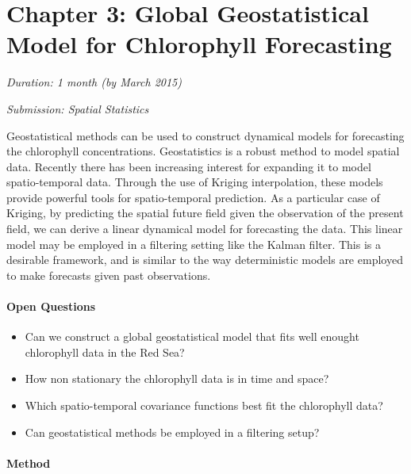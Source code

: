 \section{Chapter 3: Global Geostatistical Model for Chlorophyll Forecasting}

\noindent \emph{Duration: 1 month (by March 2015)}

\noindent \emph{Submission: Spatial Statistics}

\vspace{5mm}

Geostatistical methods can be used to construct dynamical models for
forecasting the chlorophyll concentrations. Geostatistics is a robust method to
model spatial data.  Recently there has been increasing interest for expanding
it to model spatio-temporal data. Through the use of Kriging interpolation,
these models provide powerful tools for spatio-temporal prediction. As a
particular case of Kriging, by predicting the spatial future field given the
observation of the present field, we can derive a linear dynamical model for
forecasting the data. This linear model may be employed in a filtering setting
like the Kalman filter. This is a desirable framework, and is similar to the
way deterministic models are employed to make forecasts given past
observations. 

\paragraph{Open Questions}

\begin{itemize}

\item Can we construct a global geostatistical model that fits well enought
chlorophyll data in the Red Sea?

\item How non stationary the chlorophyll data is in time and space?

\item Which spatio-temporal covariance functions best fit the chlorophyll data?

\item Can geostatistical methods be employed in a filtering setup?

\end{itemize}

\paragraph{Method} 
\mbox{}\\

